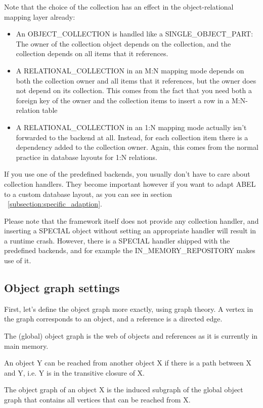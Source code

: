 Note that the choice of the collection has an effect in the object-relational mapping layer already:
\begin{itemize}
 \item An OBJECT\_COLLECTION is handled like a SINGLE\_OBJECT\_PART: The owner of the collection object depends on the collection, and the collection depends on all items that it references.
 \item A RELATIONAL\_COLLECTION in an M:N mapping mode depends on both the collection owner and all items that it references, but the owner does not depend on its collection.
 This comes from the fact that you need both a foreign key of the owner and the collection items to insert a row in a M:N-relation table
 \item A RELATIONAL\_COLLECTION in an 1:N mapping mode actually isn't forwarded to the backend at all. Instead, for each collection item there is a dependency added to the collection owner.
 Again, this comes from the normal practice in database layouts for 1:N relations.
\end{itemize}


If you use one of the predefined backends, you usually don't have to care about collection handlers.
They become important however if you want to adapt ABEL to a custom database layout, as you can see in section ~\ref{subsection:specific_adaption}.

Please note that the framework itself does not provide any collection handler, and inserting a SPECIAL object without setting an appropriate handler will result in a runtime crash.
However, there is a SPECIAL handler shipped with the predefined backends, and for example the IN\_MEMORY\_REPOSITORY makes use of it.

\subsection{Object graph settings}
\label{subsection:obect_graph_settings}

First, let's define the object graph more exactly, using graph theory.
A vertex in the graph corresponds to an object, and a reference is a directed edge.

The (global) object graph is the web of objects and references as it is currently in main memory.

An object Y can be reached from another object X if there is a path between X and Y, i.e. Y is in the transitive closure of X.

The object graph of an object X is the induced subgraph of the global object graph that contains all vertices that can be reached from X.


